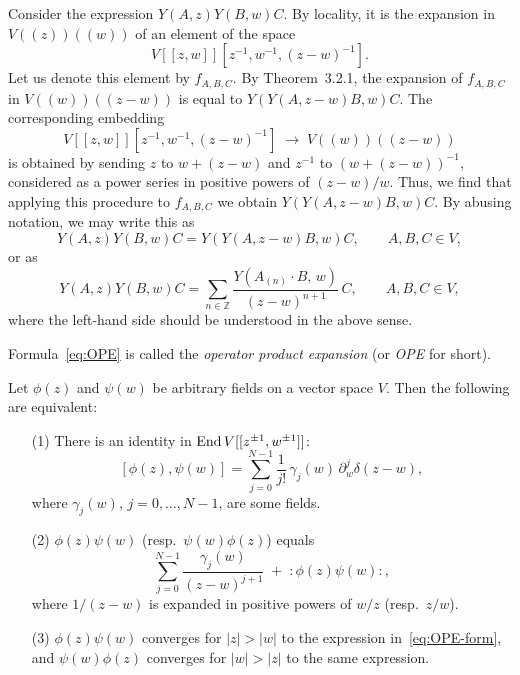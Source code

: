\documentclass[12pt]{article}
\begin{document}
Consider the expression $Y(A,z)Y(B,w)C$. 
By locality, it is the expansion in $V((z))((w))$ of an element of the space
\[
V[[z,w]][z^{-1},w^{-1},(z-w)^{-1}].
\]
Let us denote this element by $f_{A,B,C}$. 
By Theorem~3.2.1, the expansion of $f_{A,B,C}$ in $V((w))((z-w))$ 
is equal to $Y(Y(A,z-w)B,w)C$. 
The corresponding embedding
\[
V[[z,w]][z^{-1},w^{-1},(z-w)^{-1}] \;\to\; V((w))((z-w))
\]
is obtained by sending $z$ to $w+(z-w)$ and $z^{-1}$ to $(w+(z-w))^{-1}$,
considered as a power series in positive powers of $(z-w)/w$.
Thus, we find that applying this procedure to $f_{A,B,C}$ 
we obtain $Y(Y(A,z-w)B,w)C$.
By abusing notation, we may write this as
\[
Y(A,z)Y(B,w)C = Y(Y(A,z-w)B,w)C, \qquad A,B,C\in V,
\]
or as
\begin{equation}
\label{eq:OPE}
Y(A,z)Y(B,w)C = 
\sum_{n\in\mathbb{Z}} \frac{Y(A_{(n)}\cdot B,\,w)}{(z-w)^{n+1}}\,C,
\qquad A,B,C\in V,
\end{equation}
where the left-hand side should be understood in the above sense.
\begin{definition}
    Formula~\eqref{eq:OPE} is called the \emph{operator product expansion} (or \emph{OPE} for short).
\end{definition}

\begin{proposition}
Let $\phi(z)$ and $\psi(w)$ be arbitrary fields on a vector space $V$. 
Then the following are equivalent:
\begin{enumerate}
\item[(1)] There is an identity in $\operatorname{End} V[[z^{\pm1},w^{\pm1}]]$:
\begin{equation}\label{eq:delta-commutator}
[\phi(z),\psi(w)]
= \sum_{j=0}^{N-1} \frac{1}{j!}\,\gamma_j(w)\,\partial_w^{j}\delta(z-w),
\end{equation}
where $\gamma_j(w)$, $j=0,\dots,N-1$, are some fields.
\item[(2)] $\phi(z)\psi(w)$ (resp.\ $\psi(w)\phi(z)$) equals
\begin{equation}\label{eq:OPE-form}
\sum_{j=0}^{N-1} \frac{\gamma_j(w)}{(z-w)^{j+1}} 
\;+\;
:\phi(z)\psi(w):,
\end{equation}
where $1/(z-w)$ is expanded in positive powers of $w/z$ 
(resp.\ $z/w$).
\item[(3)] $\phi(z)\psi(w)$ converges for $|z|>|w|$ to the expression
in~\eqref{eq:OPE-form}, and $\psi(w)\phi(z)$ converges for $|w|>|z|$
to the same expression.
\end{enumerate}
\end{proposition}
\end{document}
